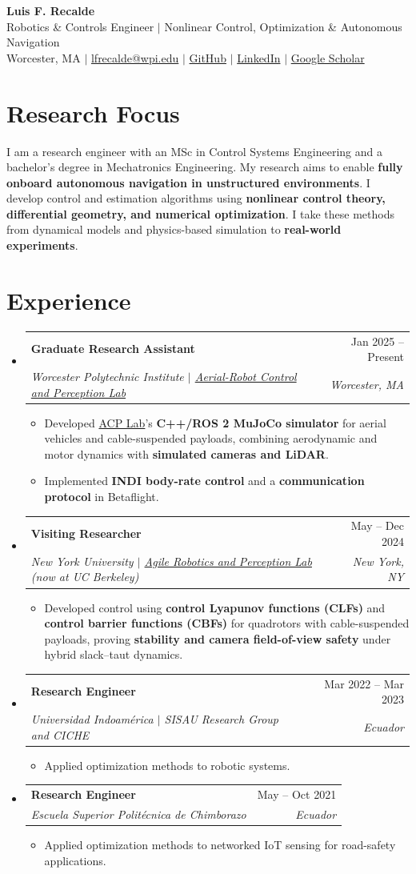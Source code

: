 \documentclass[letterpaper,11pt]{article}
\makeatletter
\newcommand{\resumeItem}[1]{
  \item {\small #1\par}\vspace{-2pt}
}
\newcommand{\resumeSubheading}[4]{
  \vspace{-2pt}\item
    \begin{tabular*}{0.97\textwidth}[t]{l@{\extracolsep{\fill}}r}
      \textbf{#1} & #2 \\
      \textit{\small#3} & \textit{\small #4} \\
    \end{tabular*}\vspace{-7pt}
}
\newcommand{\resumeSubHeadingListStart}{\begin{itemize}[leftmargin=0.15in, label={}, topsep=3pt]}
\newcommand{\resumeSubHeadingListEnd}{\end{itemize}}
\newcommand{\resumeItemListStart}{\begin{itemize}}
\newcommand{\resumeItemListEnd}{\end{itemize}\vspace{-5pt}}
\makeatother
\begin{document}
\begin{center}
\textcolor{AuthorTeal}{\textbf{\Huge Luis F. Recalde}} \\ \vspace{3pt}
\small Robotics \& Controls Engineer $|$ Nonlinear Control, Optimization \& Autonomous Navigation \\ \vspace{3pt}
Worcester, MA $|$ \href{mailto:lfrecalde@wpi.edu}{lfrecalde@wpi.edu} $|$
\href{https://github.com/lfrecalde1}{GitHub} $|$
\href{https://www.linkedin.com/in/luis-f-recalde-8a6432123}{LinkedIn} $|$
\href{https://scholar.google.com/citations?user=_v1511cAAAAJ}{Google Scholar}
\end{center}
\vspace{-12pt}
\section{Research Focus}
{\small I am a research engineer with an MSc in Control Systems Engineering and a bachelor's degree in Mechatronics Engineering.
My research aims to enable \textbf{fully onboard autonomous navigation in unstructured environments}.
I develop control and estimation algorithms using \textbf{nonlinear control theory, differential geometry, and numerical optimization}.
I take these methods from dynamical models and physics-based simulation to \textbf{real-world experiments}.\par}
\section{Experience}
\resumeSubHeadingListStart
\resumeSubheading{Graduate Research Assistant}{Jan 2025 -- Present}
{Worcester Polytechnic Institute $|$ \href{https://acp-lab.github.io/acplab-web/}{Aerial-Robot Control and Perception Lab}}{Worcester, MA}
\resumeItemListStart
\resumeItem{Developed \href{https://acp-lab.github.io/acplab-web/}{ACP Lab}'s \textbf{C++/ROS 2 MuJoCo simulator} for aerial vehicles and cable-suspended payloads, combining aerodynamic and motor dynamics with \textbf{simulated cameras and LiDAR}.}
\resumeItem{Implemented \textbf{INDI body-rate control} and a \textbf{communication protocol} in Betaflight.}
\resumeItemListEnd
\resumeSubheading{Visiting Researcher}{May -- Dec 2024}
{New York University $|$ \href{https://arplaboratory.github.io/}{Agile Robotics and Perception Lab} (now at UC Berkeley)}{New York, NY}
\resumeItemListStart
\resumeItem{Developed control using \textbf{control Lyapunov functions (CLFs)} and \textbf{control barrier functions (CBFs)} for quadrotors with cable-suspended payloads, proving \textbf{stability and camera field-of-view safety} under hybrid slack--taut dynamics.}
\resumeItemListEnd
\resumeSubheading{Research Engineer}{Mar 2022 -- Mar 2023}
{Universidad Indoam\'erica $|$ SISAU Research Group and CICHE}{Ecuador}
\resumeItemListStart
\resumeItem{Applied optimization methods to robotic systems.}
\resumeItemListEnd
\resumeSubheading{Research Engineer}{May -- Oct 2021}
{Escuela Superior Polit\'ecnica de Chimborazo}{Ecuador}
\resumeItemListStart
\resumeItem{Applied optimization methods to networked IoT sensing for road-safety applications.}
\resumeItemListEnd
\resumeSubHeadingListEnd
\end{document}
